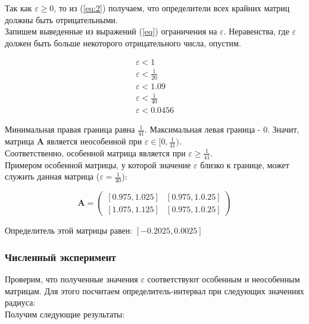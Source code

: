 Так как $\varepsilon \geq 0$, то из (\ref{eq:2}) получаем, что определители всех крайних матриц должны быть отрицательными. \\
Запишем выведенные из выражений (\ref{eq}) ограничения на $\varepsilon$. Неравенства, где $\varepsilon$ должен быть больше некоторого отрицательного числа, опустим.

\begin{subequations}
	\begin{align}
		\varepsilon < 1	\label{eps:1} \\
		\varepsilon < \frac{1}{20}	\label{eps:2} \\
		\varepsilon < 1.09	\label{eps:3} \\
		\varepsilon < \frac{1}{40}	\label{eps:4} \\
		\varepsilon < 0.0456	\label{eps:5}
	\end{align}
\end{subequations}

Минимальная правая граница равна $\frac{1}{41}$. Максимальная левая граница - 0. Значит, матрица $\textbf{A}$ является неособенной при $\varepsilon \in [0, \frac{1}{41})$. \\

Соответственно, особенной матрица является при $\varepsilon \geq \frac{1}{41}$. \\

Примером особенной матрицы, у которой значение $\varepsilon$ близко к границе, может служить данная матрица ($\varepsilon = \frac{1}{40}$):

\begin{equation}
	\textbf{A} = \begin{pmatrix}
		[0.975, 1.025] & [0.975, 1.0.25] \\
		[1.075, 1.125] & [0.975, 1.0.25]
	\end{pmatrix}
\end{equation}

Определитель этой матрицы равен: $[-0.2025, 0.0025]$

\subsubsection{Численный эксперимент}

Проверим, что полученные значения $\varepsilon$ соответствуют особенным и неособенным матрицам. Для этого посчитаем определитель-интервал при следующих значениях радиуса:
\begin{equation}
	[0, \frac{1}{70}, \frac{1}{42}, \frac{1}{41}, \frac{1}{40}, 1]
\end{equation}
Получим следующие результаты:


